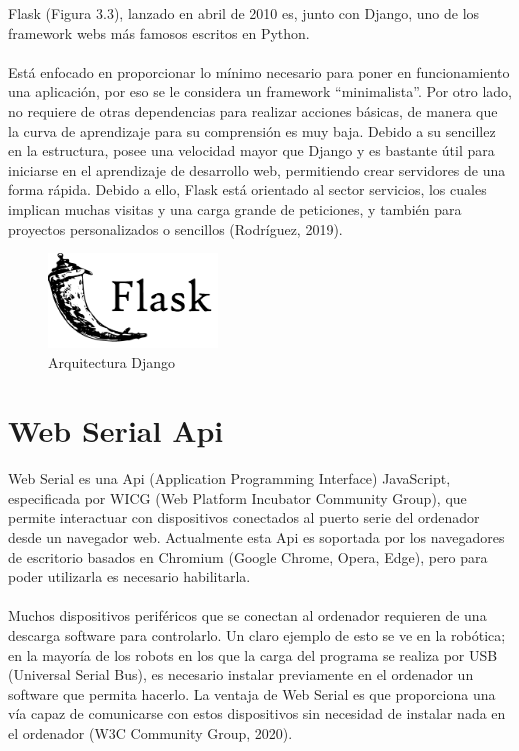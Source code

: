 \documentclass{report}
\begin{document}
Flask (Figura 3.3), lanzado en abril de 2010 es, junto con Django, uno de los framework webs más famosos escritos en Python.
\\
\\
Está enfocado en proporcionar lo mínimo necesario para poner en funcionamiento una aplicación, por eso se le considera un framework “minimalista”. Por otro lado, no requiere de otras dependencias para realizar acciones básicas, de manera que la curva de aprendizaje para su comprensión es muy baja. Debido a su sencillez en la estructura, posee una velocidad mayor que Django y es bastante útil para iniciarse en el aprendizaje de desarrollo web, permitiendo crear servidores de una forma rápida. Debido a ello, Flask está orientado al sector servicios, los cuales implican muchas visitas y una carga grande de peticiones, y también para proyectos personalizados o sencillos (Rodríguez, 2019).
\begin{figure}[h!]
  \centering
    \includegraphics[width=0.4\textwidth]{images/flask.png}
  \caption{Arquitectura Django}
  \label{Arquitectura Django}
\end{figure}

\section{Web Serial Api}

Web Serial es una Api (Application Programming Interface) JavaScript, especificada por WICG (Web Platform Incubator Community Group), que permite interactuar con dispositivos conectados al puerto serie del ordenador desde un navegador web. Actualmente esta Api es soportada por los navegadores de escritorio basados en Chromium (Google Chrome, Opera, Edge), pero para poder utilizarla es necesario habilitarla.
\\
\\
Muchos dispositivos periféricos que se conectan al ordenador requieren de una descarga software para controlarlo. Un claro ejemplo de esto se ve en la robótica; en la mayoría de los robots en los que la carga del programa se realiza por USB (Universal Serial Bus), es necesario instalar previamente en el ordenador un software que permita hacerlo. La ventaja de Web Serial es que  proporciona una vía capaz de comunicarse con estos dispositivos sin necesidad de instalar nada en el ordenador (W3C Community Group, 2020).
\end{document}

